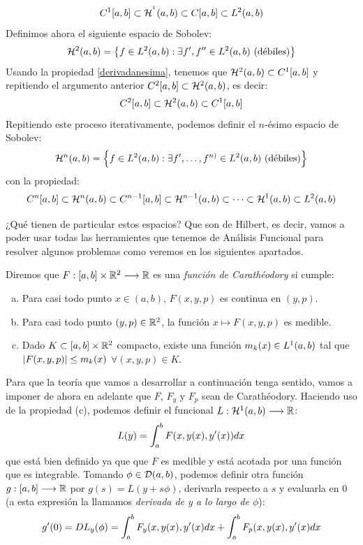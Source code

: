 \[
C^1[a,b]\subset\mathcal{H}^{ ^1 }(a,b)\subset C[a,b]\subset L^{ 2 }(a,b)
\]
Definimos ahora el siguiente espacio de Sobolev:
\[
\mathcal{H}^{ 2 }(a,b)=\left\{ f\in L^{ 2 }(a,b): \exists f',f''\in L^{ 2 }(a,b)\text{ (débiles)} \right\}
\]
Usando la propiedad \ref{derivadanesima}, tenemos que $\mathcal{H}^{ 2 }(a,b)\subset C^1[a,b]$ y repitiendo el argumento anterior $C^2[a,b]\subset \mathcal{H}^{ 2 }(a,b)$, es decir:
\[
C^2[a,b]\subset \mathcal{H}^{ 2 }(a,b)\subset C^1[a,b]
\]
Repitiendo este proceso iterativamente, podemos definir el $n$-ésimo espacio de Sobolev:
\[
\mathcal{H}^{ n }(a,b)=\left\{ f\in L^{ 2 }(a,b): \exists f',\dots,f^{n)}\in L^{ 2 }(a,b) \text{ (débiles)} \right\}
\]
con la propiedad:
\[
C^{n}[a,b]\subset\mathcal{H}^{ n }(a,b)\subset C^{n-1}[a,b]\subset\mathcal{H}^{ n-1 }(a,b)\subset\dots\subset\mathcal{H}^{ 1 }(a,b)\subset L^{ 2 }(a,b)
\]

¿Qué tienen de particular estos espacios? Que son de Hilbert, es decir, vamos a poder usar todas las herramientes que tenemos de Análisis Funcional para resolver algunos problemas como veremos en los siguientes apartados.

\begin{definition}
Diremos que $F : [a,b]\times\mathbb{R}^2 \longrightarrow \mathbb{R}$ es una \textit{función de Carathéodory} si cumple:
\begin{enumerate}[(a)]
\item Para casi todo punto $x\in(a,b)$, $F(x,y,p)$ es continua en $(y,p)$.
\item Para casi todo punto $(y,p)\in\mathbb{R}^2$, la función $x\mapsto F(x,y,p)$ es medible.
\item Dado $K\subset[a,b]\times\mathbb{R}^2$ compacto, existe una función $m_k(x)\in L^{ 1 }(a,b)$ tal que $\left| F(x,y,p) \right|\leq m_k(x)$ $\forall(x,y,p)\in K$.
\end{enumerate}
\end{definition}

Para que la teoría que vamos a desarrollar a continuación tenga sentido, vamos a imponer de ahora en adelante que $F$, $F_y$ y $F_p$ sean de Carathéodory. Haciendo uso de la propiedad (c), podemos definir el funcional $L : \mathcal{H}^{ 1 }(a,b) \longrightarrow \mathbb{R}$:
\[
L(y)=\displaystyle\int_{ a }^{ b } F(x,y(x),y'(x))dx
\]
que está bien definido ya que que $F$ es medible y está acotada por una función que es integrable. Tomando $\phi\in\mathcal{D}(a,b)$, podemos definir otra función $g : [a,b] \longrightarrow \mathbb{R}$ por $g(s)=L(y+s\phi)$, derivarla respecto a $s$ y evaluarla en 0 (a esta expresión la llamamos \textit{derivada de y a lo largo de $\phi$}):
\[
g'(0)=DL_y(\phi)=\displaystyle\int_{ a }^{ b } F_y(x,y(x),y'(x)dx+\displaystyle\int_{ a }^{ b } F_p(x,y(x),y'(x)dx
\]
\newpage

